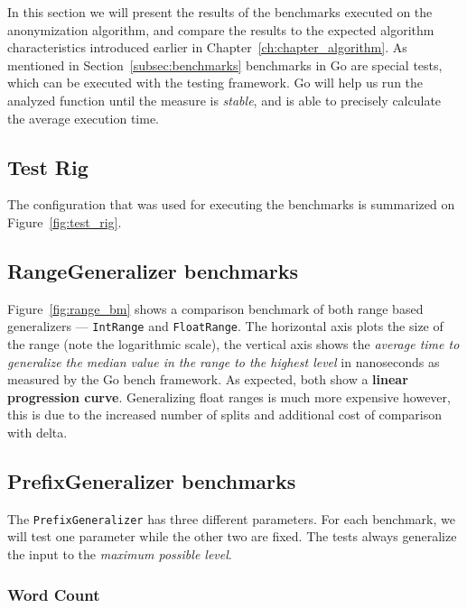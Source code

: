 In this section we will present the results of the benchmarks executed on the anonymization algorithm, and compare the results to the expected algorithm characteristics introduced earlier in Chapter~\ref{ch:chapter_algorithm}. As mentioned in Section~\ref{subsec:benchmarks} benchmarks in Go are special tests, which can be executed with the testing framework. Go will help us run the analyzed function until the measure is \emph{stable}, and is able to precisely calculate the average execution time.

\subsection{Test Rig}

The configuration that was used for executing the benchmarks is summarized on Figure~\ref{fig:test_rig}.


\subsection{RangeGeneralizer benchmarks}

Figure~\ref{fig:range_bm} shows a comparison benchmark of both range based generalizers --- \texttt{IntRange} and \texttt{FloatRange}. The horizontal axis plots the size of the range (note the logarithmic scale), the vertical axis shows the \emph{average time to generalize the median value in the range to the highest level} in nanoseconds as measured by the Go bench framework. As expected, both show a \textbf{linear progression curve}. Generalizing float ranges is much more expensive however, this is due to the increased number of splits and additional cost of comparison with delta.

\vspace{\baselineskip}


\subsection{PrefixGeneralizer benchmarks}

The \texttt{PrefixGeneralizer} has three different parameters. For each benchmark, we will test one parameter while the other two are fixed. The tests always generalize the input to the \emph{maximum possible level}.

\subsubsection{Word Count}

